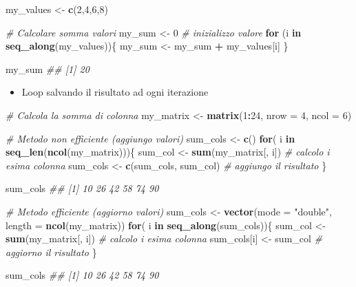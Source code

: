 \documentclass[
]{book}
\newenvironment{Shaded}{\begin{snugshade}}{\end{snugshade}}
\newcommand{\CommentTok}[1]{\textcolor[rgb]{0.56,0.35,0.01}{\textit{#1}}}
\newcommand{\ControlFlowTok}[1]{\textcolor[rgb]{0.13,0.29,0.53}{\textbf{#1}}}
\newcommand{\DataTypeTok}[1]{\textcolor[rgb]{0.13,0.29,0.53}{#1}}
\newcommand{\DecValTok}[1]{\textcolor[rgb]{0.00,0.00,0.81}{#1}}
\newcommand{\KeywordTok}[1]{\textcolor[rgb]{0.13,0.29,0.53}{\textbf{#1}}}
\newcommand{\NormalTok}[1]{#1}
\newcommand{\OperatorTok}[1]{\textcolor[rgb]{0.81,0.36,0.00}{\textbf{#1}}}
\newcommand{\StringTok}[1]{\textcolor[rgb]{0.31,0.60,0.02}{#1}}
\providecommand{\tightlist}{%
  \setlength{\itemsep}{0pt}\setlength{\parskip}{0pt}}
\begin{document}
\begin{Shaded}
\begin{Highlighting}[]
\NormalTok{my_values <-}\StringTok{ }\KeywordTok{c}\NormalTok{(}\DecValTok{2}\NormalTok{,}\DecValTok{4}\NormalTok{,}\DecValTok{6}\NormalTok{,}\DecValTok{8}\NormalTok{)}

\CommentTok{# Calcolare somma valori}
\NormalTok{my_sum <-}\StringTok{ }\DecValTok{0}      \CommentTok{# inizializzo valore}
\ControlFlowTok{for}\NormalTok{ (i }\ControlFlowTok{in} \KeywordTok{seq_along}\NormalTok{(my_values))\{}
\NormalTok{  my_sum <-}\StringTok{ }\NormalTok{my_sum }\OperatorTok{+}\StringTok{ }\NormalTok{my_values[i]}
\NormalTok{\}}

\NormalTok{my_sum}
\CommentTok{## [1] 20}
\end{Highlighting}
\end{Shaded}

\begin{itemize}
\tightlist
\item
  Loop salvando il risultato ad ogni iterazione
\end{itemize}

\begin{Shaded}
\begin{Highlighting}[]
\CommentTok{# Calcola la somma di colonna}
\NormalTok{my_matrix <-}\StringTok{ }\KeywordTok{matrix}\NormalTok{(}\DecValTok{1}\OperatorTok{:}\DecValTok{24}\NormalTok{, }\DataTypeTok{nrow =} \DecValTok{4}\NormalTok{, }\DataTypeTok{ncol =} \DecValTok{6}\NormalTok{)}

\CommentTok{# Metodo non efficiente (aggiungo valori)}
\NormalTok{sum_cols <-}\StringTok{ }\KeywordTok{c}\NormalTok{()}
\ControlFlowTok{for}\NormalTok{( i }\ControlFlowTok{in} \KeywordTok{seq_len}\NormalTok{(}\KeywordTok{ncol}\NormalTok{(my_matrix)))\{}
\NormalTok{  sum_col <-}\StringTok{ }\KeywordTok{sum}\NormalTok{(my_matrix[, i])   }\CommentTok{# calcolo i esima colonna}
\NormalTok{  sum_cols <-}\StringTok{ }\KeywordTok{c}\NormalTok{(sum_cols, sum_col) }\CommentTok{# aggiungo il risultato}
\NormalTok{\}}

\NormalTok{sum_cols}
\CommentTok{## [1] 10 26 42 58 74 90}

\CommentTok{# Metodo efficiente (aggiorno valori)}
\NormalTok{sum_cols <-}\StringTok{ }\KeywordTok{vector}\NormalTok{(}\DataTypeTok{mode =} \StringTok{"double"}\NormalTok{, }\DataTypeTok{length =} \KeywordTok{ncol}\NormalTok{(my_matrix))}
\ControlFlowTok{for}\NormalTok{( i }\ControlFlowTok{in} \KeywordTok{seq_along}\NormalTok{(sum_cols))\{}
\NormalTok{  sum_col <-}\StringTok{ }\KeywordTok{sum}\NormalTok{(my_matrix[, i])   }\CommentTok{# calcolo i esima colonna}
\NormalTok{  sum_cols[i] <-}\StringTok{  }\NormalTok{sum_col }\CommentTok{# aggiorno il risultato}
\NormalTok{\}}

\NormalTok{sum_cols}
\CommentTok{## [1] 10 26 42 58 74 90}
\end{Highlighting}
\end{Shaded}
\end{document}
